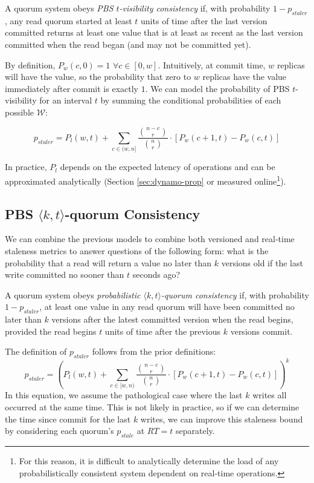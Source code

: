 \documentclass{vldb}
\begin{document}
\begin{definition}
A quorum system obeys \textit{PBS $t$-visibility consistency} if, with
probability $1-p_{staler}$, any read quorum started at least $t$ units
of time after the last version committed returns at least one value
that is at least as recent as the last version committed when the read
began (and may not be committed yet).
\end{definition}

By definition, $P_w(c,0) = 1$ $\forall c \in [0, w]$.  Intuitively, at
commit time, $w$ replicas will have the value, so the probability that
zero to $w$ replicas have the value immediately after commit is
exactly $1$.  We can model the probability of PBS $t$-visibility for an interval $t$ by summing the conditional probabilities of each possible $\mathcal{W}$:

\begin{equation}
p_{staler} = P_l(w, t)+\sum_{c\in(w, n]} \frac{{n-c \choose r}}{{n \choose r}}\cdot [P_w(c+1, t)-P_w(c,t)]
\end{equation}

In practice, $P_l$ depends on the expected latency of operations and can be
approximated analytically (Section \ref{sec:dynamo-prop} or measured
online\footnote{For this reason, it is difficult to analytically
  determine the load of any probabilistically consistent system
  dependent on real-time operations.}).

\subsection{PBS $\langle k, t
  \rangle$-quorum Consistency}

We can combine the previous models to combine both versioned and
real-time staleness metrics to answer questions of the following form:
what is the probability that a read will return a value no later than
$k$ versions old if the last write committed no sooner than $t$ seconds
ago?
\begin{definition}
A quorum system obeys \textit{probabilistic $\langle k, t
  \rangle$-quorum consistency} if, with probability $1-p_{staler}$, at
least one value in any read quorum will have been committed no later
than $k$ versions after the latest committed version when the read
begins, provided the read begins $t$ units of time after the previous
$k$ versions commit.
\end{definition}
The definition of $p_{staler}$ follows from the prior definitions:
\begin{equation}
p_{staler} = (P_l(w, t)+\sum_{c\in[w, n)} \frac{{n-c \choose r}}{{n \choose r}} \cdot [P_w(c+1, t)-P_w(c,t)])^k
\end{equation}
In this equation, we assume the pathological case where the last $k$
writes all occurred at the same time.  This is not likely in practice,
so if we can determine the time since commit for the last $k$ writes,
we can improve this staleness bound by considering each quorum's $p_{stale}$ at $RT=t$ separately.
\end{document}

